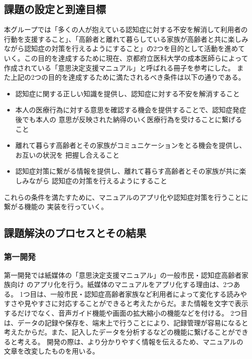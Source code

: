 \documentclass[twocolumn,draft]{jsarticle}
\begin{document}
\subsection{課題の設定と到達目標}
\begin{hissu}
本グループでは「多くの人が抱えている認知症に対する不安を解消して利用者の行動を支援すること」、「高齢者と離れて暮らしている家族が高齢者と共に楽しみながら認知症の対策を行えるようにすること」の2つを目的として活動を進めていく。この目的を達成するために現在、京都府立医科大学の成本医師らによって作成されている「意思決定支援マニュアル」と呼ばれる冊子を参考にした。
また上記の2つの目的を達成するために満たされるべき条件は以下の通りである。
\begin{itemize}
\item 認知症に関する正しい知識を提供し、認知症に対する不安を解消すること
\item 本人の医療行為に対する意思を確認する機会を提供することで、認知症発症後でも本人の
意思が反映された納得のいく医療行為を受けることに繋げること
\item 離れて暮らす高齢者とその家族がコミュニケーションをとる機会を提供し、お互いの状況を
把握し合えること
\item 認知症対策に繋がる情報を提供し、離れて暮らす高齢者とその家族が共に楽しみながら
認知症の対策を行えるようにすること
\end{itemize}
これらの条件を満たすために、マニュアルのアプリ化や認知症対策を行うことに繋がる機能の
実装を行っていく。
\end{hissu}

\subsection{課題解決のプロセスとその結果}
\subsubsection{第一開発}
\begin{hissu}
第一開発では紙媒体の「意思決定支援マニュアル」の一般市民・認知症高齢者家族向け
のアプリ化を行う。紙媒体のマニュアルをアプリ化する理由は、2つある。
1つ目は、一般市民・認知症高齢者家族など利用者によって変化する読みやすさや見やすさに対応することができると考えたからだ。また情報を文字で表示するだけでなく、音声ガイド機能や画面の拡大縮小の機能などを付ける。
2つ目は、データの記録や保存を、端末上で行うことにより、記録管理が容易になると考えたからだ。また、記入したデータを分析するなどの機能に繋げることができると考える。
開発の際は、より分かりやすく情報を伝えるため、マニュアルの文章を改変したものを用いる。

\end{hissu}
\end{document}
